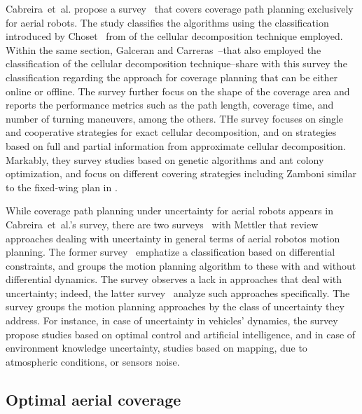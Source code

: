 Cabreira~et~al. propose a survey~\citep{cabreira2019survey} that covers coverage path planning exclusively for aerial robots. The study classifies the algorithms using the classification introduced by Choset~\citep{choset2001coverage} from  of the cellular decomposition technique employed. Within the same section, Galceran and Carreras~\citep{galceran2013survey}--that also employed the classification of the cellular decomposition technique--share with this survey the classification regarding the approach for coverage planning that can be either online or offline. The survey further focus on the shape of the coverage area and reports the performance metrics such as the path length, coverage time, and number of turning maneuvers, among the others. THe survey focuses on single and cooperative strategies for exact cellular decomposition, and on strategies based on full and partial information from approximate cellular decomposition. Markably, they survey studies based on genetic algorithms  and ant colony optimization, and focus on different covering strategies including Zamboni similar to the fixed-wing plan in .

While coverage path planning under uncertainty for aerial robots appears in Cabreira~et~al.'s survey, there are two surveys~\citep{goerzen2010survey,dadkhah2012survey} with Mettler that review approaches dealing with uncertainty in general terms of aerial robotos motion planning. 
The former survey~\citep{goerzen2010survey} emphatize a classification based on differential constraints, and groups the motion planning algorithm to these with and without differential dynamics. The survey observes a lack in approaches that deal with uncertainty; indeed, the latter survey~\citep{dadkhah2012survey} analyze such approaches specifically. The survey groups the motion planning approaches by the class of uncertainty they address. For instance, in case of uncertainty in vehicles' dynamics, the survey propose studies based on optimal control and artificial intelligence, and in case of environment knowledge uncertainty, studies based on mapping, due to atmospheric conditions, or sensors noise. 

\subsection{Optimal aerial coverage}
\label{sec:opti-cov}

